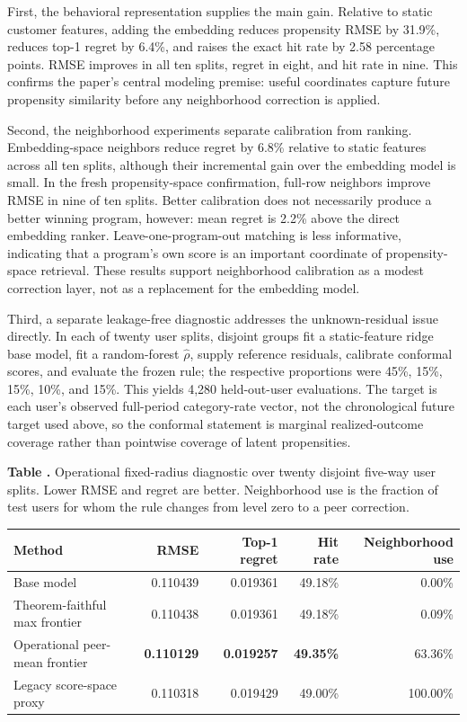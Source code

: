 \documentclass[11pt]{article}
\theoremstyle{noteplain}
\theoremstyle{definition}
\begin{document}
First, the behavioral representation supplies the main gain. Relative to static customer features, adding the embedding reduces propensity RMSE by 31.9\%, reduces top-1 regret by 6.4\%, and raises the exact hit rate by 2.58 percentage points. RMSE improves in all ten splits, regret in eight, and hit rate in nine. This confirms the paper's central modeling premise: useful coordinates capture future propensity similarity before any neighborhood correction is applied.

Second, the neighborhood experiments separate calibration from ranking. Embedding-space neighbors reduce regret by 6.8\% relative to static features across all ten splits, although their incremental gain over the embedding model is small. In the fresh propensity-space confirmation, full-row neighbors improve RMSE in nine of ten splits. Better calibration does not necessarily produce a better winning program, however: mean regret is 2.2\% above the direct embedding ranker. Leave-one-program-out matching is less informative, indicating that a program's own score is an important coordinate of propensity-space retrieval. These results support neighborhood calibration as a modest correction layer, not as a replacement for the embedding model.

Third, a separate leakage-free diagnostic addresses the unknown-residual issue directly. In each of twenty user splits, disjoint groups fit a static-feature ridge base model, fit a random-forest $\widehat\rho$, supply reference residuals, calibrate conformal scores, and evaluate the frozen rule; the respective proportions were 45\%, 15\%, 15\%, 10\%, and 15\%. This yields 4,280 held-out-user evaluations. The target is each user's observed full-period category-rate vector, not the chronological future target used above, so the conformal statement is marginal realized-outcome coverage rather than pointwise coverage of latent propensities.

\newpage
\begin{center}
\parbox{.94\linewidth}{\small\textbf{Table \thetable.} Operational fixed-radius diagnostic over twenty disjoint five-way user splits. Lower RMSE and regret are better. Neighborhood use is the fraction of test users for whom the rule changes from level zero to a peer correction.}
\label{tab:operational}
\vspace{.35em}
\small
\begin{tabular}{lrrrr}
\toprule
Method & RMSE & Top-1 regret & Hit rate & Neighborhood use \\
\midrule
Base model & 0.110439 & 0.019361 & 49.18\% & 0.00\% \\
Theorem-faithful max frontier & 0.110438 & 0.019361 & 49.18\% & 0.09\% \\
Operational peer-mean frontier & \textbf{0.110129} & \textbf{0.019257} & \textbf{49.35\%} & 63.36\% \\
Legacy score-space proxy & 0.110318 & 0.019429 & 49.00\% & 100.00\% \\
\bottomrule
\end{tabular}
\end{center}
\end{document}
